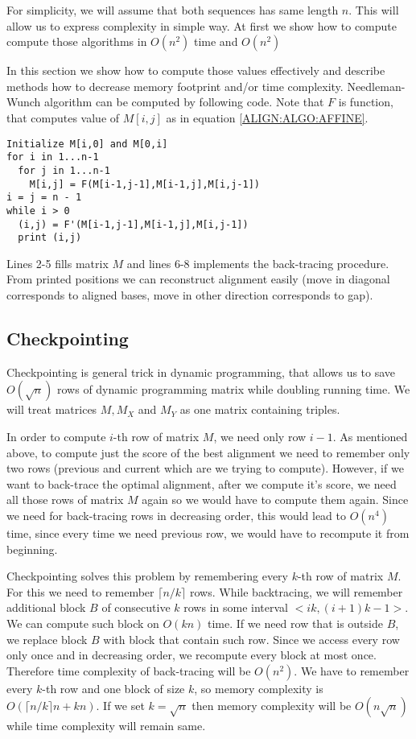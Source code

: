 For simplicity, we will assume that both sequences has same length $n$. This
will allow us to express complexity in simple way.  At first we show how
to compute compute those algorithms in $O(n^2)$ time and $O(n^2)$ 

In this section we show how to compute
those values effectively and describe 
methods how to decrease memory footprint and/or time complexity. Needleman-Wunch
algorithm can be computed by following code. Note that $F$ is function, that
computes value of $M[i,j]$ as in equation \ref{ALIGN:ALGO:AFFINE}.

\begin{lstlisting}
Initialize M[i,0] and M[0,i]
for i in 1...n-1
  for j in 1...n-1
    M[i,j] = F(M[i-1,j-1],M[i-1,j],M[i,j-1])
i = j = n - 1
while i > 0
  (i,j) = F'(M[i-1,j-1],M[i-1,j],M[i,j-1])
  print (i,j)
\end{lstlisting}

Lines 2-5 fills matrix $M$ and lines 6-8 implements the back-tracing procedure.
From printed positions we can reconstruct alignment easily (move in diagonal
corresponds to aligned bases, move in other direction corresponds to gap).


\subsection{Checkpointing}

Checkpointing is general trick in dynamic programming, that allows us to save
$O(\sqrt n)$ rows of dynamic programming matrix while doubling running time.
We will treat matrices $M,M_X$ and $M_Y$ as one matrix containing triples.

In order to compute $i$-th row of matrix $M$, we need only row
$i-1$. As mentioned above, to compute just the score of the best alignment we
need to remember only two rows (previous and current which are we trying to
compute). However, if we want to back-trace the optimal alignment, after we
compute it's score, we need all those rows of matrix $M$ again so we would have
to compute them again. Since we need for back-tracing rows in decreasing order,
this would lead to $O(n^4)$ time, since every time we need previous row, we
would have to recompute it from beginning.

Checkpointing solves this problem by remembering every $k$-th row of matrix $M$.
For this we need to remember $\lceil n/k\rceil$ rows.
While backtracing, we will remember additional block $B$ of consecutive $k$ rows in
some interval $<ik,(i+1)k-1>$. We can compute such block on $O(kn)$ time. 
If we need row that is outside $B$, we replace block $B$ with block that contain
such row. Since we access every row only once and in decreasing order, we
recompute every block at most once. Therefore time complexity of back-tracing
will be $O(n^2)$. We have to remember every $k$-th row and one block of size
$k$, so memory complexity is $O(\lceil n/k\rceil n+ kn)$. If we set $k=\sqrt n$
then memory complexity will be $O(n\sqrt n)$ while time complexity will remain
same.


